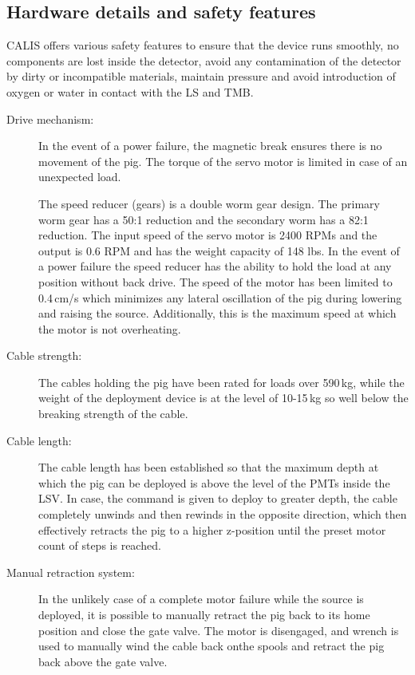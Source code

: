 \subsection{Hardware details and safety features}
CALIS offers various safety features to ensure that the device runs smoothly, no components are lost inside the detector, avoid any contamination of the detector by dirty or incompatible materials, maintain pressure and avoid introduction of oxygen or water in contact with the LS and TMB. %

\begin{description}

\item[Drive mechanism:]
In the event of a power failure, the magnetic break ensures there is no movement of the pig. The torque of the servo motor is limited in case of an unexpected load. 

The speed reducer (gears) is a double worm gear design. The primary worm gear has a 50:1 reduction and the secondary worm has a 82:1 reduction. The input speed of the servo motor is 2400 RPMs and the output is 0.6 RPM and has the weight capacity of 148 lbs. In the event of a power failure the speed reducer has the ability to hold the load at any position without back drive. The speed of the motor has been limited to 0.4\,cm/s which minimizes any lateral oscillation of the pig during lowering and raising the source. Additionally, this is the maximum speed at which the motor is not overheating.


\item[Cable strength:]
The cables holding the pig have been rated for loads over 590\,kg, while the weight of the deployment device is at the level of 10-15\,kg so well below the breaking strength of the cable. 

\item[Cable length:]
The cable length has been established so that the maximum depth at which the pig can be deployed is above the level of the PMTs inside the LSV. In case, the command is given to deploy to greater depth, the cable completely unwinds and then rewinds in the opposite direction, which then effectively retracts the pig to a higher z-position until the preset motor count of steps is reached. 

\item[Manual retraction system:]
In the unlikely case of a complete motor failure while the source is deployed, it is possible to manually retract the pig back to its home position and close the gate valve. The motor is disengaged, and wrench is used to manually wind the cable back onthe spools and retract the pig back above the gate valve. 
   

\end{description}
